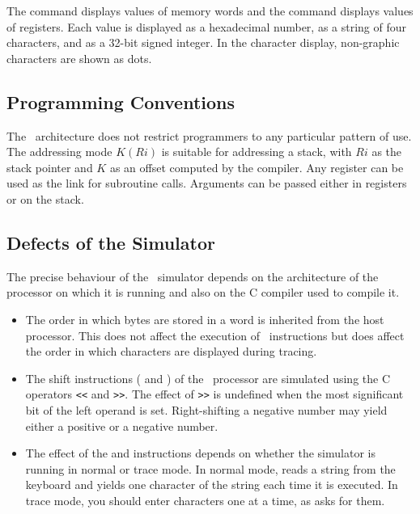 The command  displays values of memory words and the command
 displays values of registers. Each value is displayed as a
hexadecimal number, as a string of four characters, and as a 32-bit
signed integer. In the character display, non-graphic characters are
shown as dots.

\subsection{Programming Conventions}

The \moon\ architecture does not restrict programmers to any particular
pattern of use. The addressing mode $K(Ri)$ is suitable for addressing a
stack, with $Ri$ as the stack pointer and $K$ as an offset computed by
the compiler. Any register can be used as the link for subroutine calls.
Arguments can be passed either in registers or on the stack.

\subsection{Defects of the Simulator}

The precise behaviour of the \moon\ simulator depends on the
architecture of the processor on which it is running and also on the C
compiler used to compile it.

\begin{itemize}

\item The order in which bytes are stored in a word is inherited from
      the host processor. This does not affect the execution of \moon\
      instructions but does affect the order in which characters are
      displayed during tracing.

\item The shift instructions ( and ) of the \moon\
      processor are simulated using the C operators \verb"<<" and
      \verb">>". The effect of \verb">>" is undefined when the most
      significant bit of the left operand is set. Right-shifting a
      negative number may yield either a positive or a negative number.

\item The effect of the \kw{putc} and  instructions depends on
      whether the simulator is running in normal or trace mode. In
      normal mode,  reads a string from the keyboard and yields
      one character of the string each time it is executed. In trace
      mode, you should enter characters one at a time, as \kw{getc} asks
      for them.

\end{itemize}


